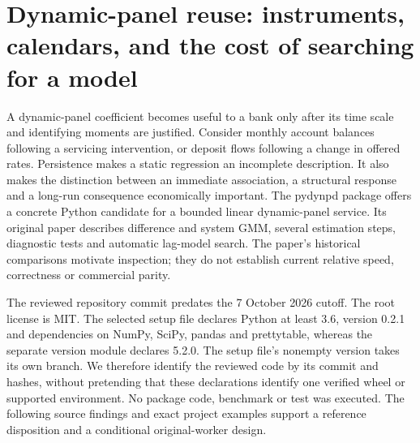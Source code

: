 \section{Dynamic-panel reuse: instruments, calendars, and the cost of searching for a model}
\label{sec:exec24-pydynpd}

A dynamic-panel coefficient becomes useful to a bank only after its time scale and identifying moments are justified.
Consider monthly account balances following a servicing intervention, or deposit flows
following a change in offered rates. Persistence makes a static regression an incomplete
description. It also makes the distinction between an immediate association, a structural
response and a long-run consequence economically important. The pydynpd package offers
a concrete Python candidate for a bounded linear dynamic-panel service. Its original paper
describes difference and system GMM, several estimation steps, diagnostic tests and automatic
lag-model search. The paper's historical comparisons motivate inspection; they do not establish
current relative speed, correctness or commercial parity.~\citep{exec24_pydynpd_paper}

The reviewed repository commit predates the 7 October 2026 cutoff. The root license is MIT.
The selected setup file declares Python at least 3.6, version 0.2.1 and dependencies on NumPy,
SciPy, pandas and prettytable, whereas the separate version module declares 5.2.0. The setup
file's nonempty version takes its own branch. We therefore identify the reviewed code by its
commit and hashes, without pretending that these declarations identify one verified wheel or
supported environment. No package code, benchmark or test was executed. The following
source findings and exact project examples support a reference disposition and a conditional
original-worker design.~\citep{exec24_pydynpd_source}

